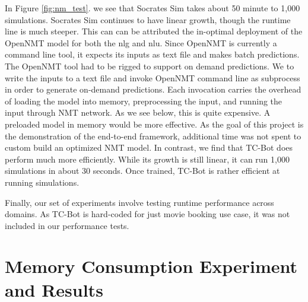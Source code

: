 In Figure \ref{fig:nm_test}. we see that Socrates Sim takes about 50 minute to 1,000 simulations. Socrates Sim continues to have linear growth, though the runtime line is much steeper. This can can be attributed the in-optimal deployment of the OpenNMT model for both the nlg and nlu. Since OpenNMT is currently a command line tool, it expects its inputs as text file and makes batch predictions. The OpenNMT tool had to be rigged to support on demand predictions. We to write the inputs to a text file and  invoke OpenNMT command line as subprocess in order to generate on-demand predictions. Each invocation carries the overhead of loading the model into memory, preprocessing the input, and running the input through NMT network. As we see below, this is quite expensive. A preloaded model in memory would be more effective. As the goal of this project is the demonstration of the end-to-end framework, additional time was not spent to custom build an optimized NMT model. In contrast, we find that TC-Bot does perform much more efficiently. While its growth is still linear, it can run 1,000 simulations in about 30 seconds. Once trained, TC-Bot is rather efficient at running simulations. 

 Finally, our set of experiments involve testing runtime performance across domains. As TC-Bot is hard-coded for just movie booking use case, it was not included in our performance tests. 
 
 
\section{Memory Consumption Experiment and Results}





